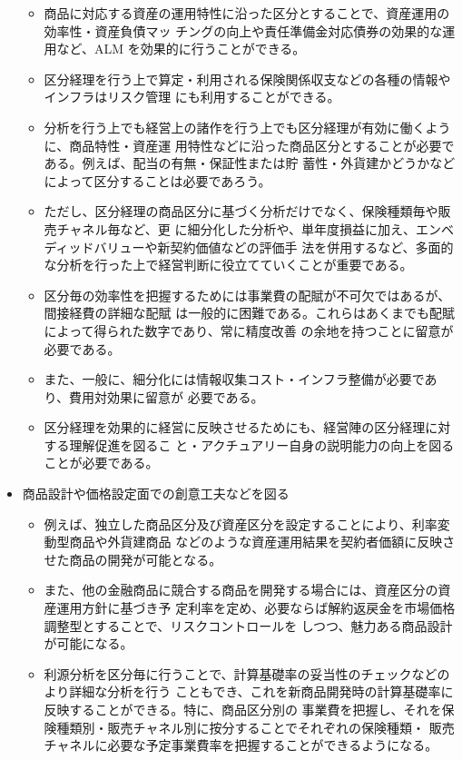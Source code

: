 \documentclass[report,gutter=10mm,fore-edge=10mm,uplatex,dvipdfmx]{jlreq}
\begin{document}
\begin{itemize}
\begin{itemize}
\item[] 商品に対応する資産の運用特性に沿った区分とすることで、資産運用の効率性・資産負債マッ
 チングの向上や責任準備金対応債券の効果的な運用など、ALM を効果的に行うことができる。
\item[] 区分経理を行う上で算定・利用される保険関係収支などの各種の情報やインフラはリスク管理
 にも利用することができる。
\item[] 分析を行う上でも経営上の諸作を行う上でも区分経理が有効に働くように、商品特性・資産運
 用特性などに沿った商品区分とすることが必要である。例えば、配当の有無・保証性または貯
 蓄性・外貨建かどうかなどによって区分することは必要であろう。
\item[] ただし、区分経理の商品区分に基づく分析だけでなく、保険種類毎や販売チャネル毎など、更
 に細分化した分析や、単年度損益に加え、エンベディッドバリューや新契約価値などの評価手
 法を併用するなど、多面的な分析を行った上で経営判断に役立てていくことが重要である。
\item[] 区分毎の効率性を把握するためには事業費の配賦が不可欠ではあるが、間接経費の詳細な配賦
 は一般的に困難である。これらはあくまでも配賦によって得られた数字であり、常に精度改善
 の余地を持つことに留意が必要である。
\item[] また、一般に、細分化には情報収集コスト・インフラ整備が必要であり、費用対効果に留意が
 必要である。
\item[] 区分経理を効果的に経営に反映させるためにも、経営陣の区分経理に対する理解促進を図るこ
 と・アクチュアリー自身の説明能力の向上を図ることが必要である。
\end{itemize}
 \item[] 商品設計や価格設定面での創意工夫などを図る
\begin{itemize}
\item[] 例えば、独立した商品区分及び資産区分を設定することにより、利率変動型商品や外貨建商品
 などのような資産運用結果を契約者価額に反映させた商品の開発が可能となる。
\item[] また、他の金融商品に競合する商品を開発する場合には、資産区分の資産運用方針に基づき予
 定利率を定め、必要ならば解約返戻金を市場価格調整型とすることで、リスクコントロールを
 しつつ、魅力ある商品設計が可能になる。
\item[] 利源分析を区分毎に行うことで、計算基礎率の妥当性のチェックなどのより詳細な分析を行う
 こともでき、これを新商品開発時の計算基礎率に反映することができる。特に、商品区分別の
 事業費を把握し、それを保険種類別・販売チャネル別に按分することでそれぞれの保険種類・
 販売チャネルに必要な予定事業費率を把握することができるようになる。
\end{itemize}
\end{itemize}
\end{document}
